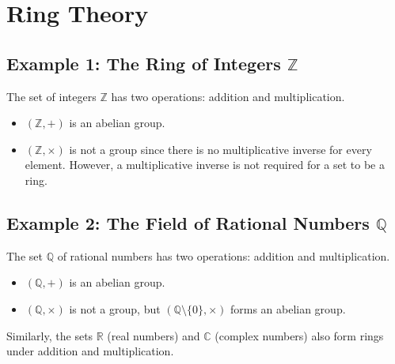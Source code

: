 \documentclass{article}
\begin{document}

\section{Ring Theory}
\subsection*{Example 1: The Ring of Integers \(\mathbb{Z}\)}
The set of integers \(\mathbb{Z}\) has two operations: addition and multiplication.
\begin{itemize}
    \item \((\mathbb{Z}, +)\) is an abelian group.
    \item \((\mathbb{Z}, \times)\) is not a group since there is no multiplicative inverse for every element. However, a multiplicative inverse is not required for a set to be a ring.
\end{itemize}

\subsection*{Example 2: The Field of Rational Numbers \(\mathbb{Q}\)}
The set \(\mathbb{Q}\) of rational numbers has two operations: addition and multiplication.
\begin{itemize}
    \item \((\mathbb{Q}, +)\) is an abelian group.
    \item \((\mathbb{Q}, \times)\) is not a group, but \((\mathbb{Q} \setminus \{0\}, \times)\) forms an abelian group.
\end{itemize}

Similarly, the sets \(\mathbb{R}\) (real numbers) and \(\mathbb{C}\) (complex numbers) also form rings under addition and multiplication.
\end{document}
